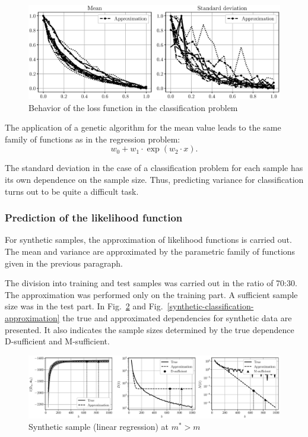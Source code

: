 \documentclass[
11pt,%
tightenlines,%
twoside,%
onecolumn,%
nofloats,%
nobibnotes,%
nofootinbib,%
superscriptaddress,%
noshowpacs,%
centertags]%
{revtex4-2}
\begin{document}
\begin{figure}[h!]
    \centering
    \includegraphics[width=\textwidth]{../paper/figures/gray/eps/datasets-classification}
    \caption{Behavior of the loss function in the classification problem}
    \label{datasets-classification}
\end{figure}

The application of a genetic algorithm for the mean value leads to the same family of functions as in the regression problem:
\[ w_0 + w_1 \cdot \exp(w_2 \cdot x). \]

The standard deviation in the case of a classification problem for each sample has its own dependence on the sample size. Thus, predicting variance for classification turns out to be quite a difficult task.

\subsubsection{Prediction of the likelihood function}

For synthetic samples, the approximation of likelihood functions is carried out. The mean and variance are approximated by the parametric family of functions given in the previous paragraph.

The division into training and test samples was carried out in the ratio of 70:30. The approximation was performed only on the training part. A sufficient sample size was in the test part. In Fig.~\ref{synthetic-regression-approximation} and Fig.~\ref{synthetic-classification-approximation} the true and approximated dependencies for synthetic data are presented. It also indicates the sample sizes determined by the true dependence D-sufficient and M-sufficient. 

\begin{figure}[h!]
    \centering
    \includegraphics[width=\textwidth]{../paper/figures/gray/eps/synthetic-regression-approximation}
    \caption{Synthetic sample (linear regression) at $m^*> m$}
    \label{synthetic-regression-approximation}
\end{figure}
\end{document}
